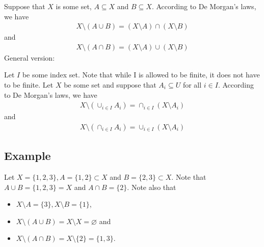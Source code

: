\documentclass[letterpaper,10pt,english]{jupyterBook}
\begin{document}
\sphinxAtStartPar
Suppose that \(X\) is some set, \(A \subseteq X\) and \(B \subseteq X\). According to De Morgan’s laws, we have
\begin{equation*}
\begin{split}X \setminus (A \cup B) = (X \setminus A) \cap (X \setminus B) \end{split}
\end{equation*}
\sphinxAtStartPar
and
\begin{equation*}
\begin{split}X \setminus (A \cap B) = (X \setminus A) \cup (X \setminus B) \end{split}
\end{equation*}
\sphinxAtStartPar
General version:

\sphinxAtStartPar
Let \(I\) be some index set. Note that while I is allowed to be finite, it does not have to be finite. Let \(X\) be some set and suppose that \(A_i \subseteq U\) for all \(i \in I\). According to De Morgan’s laws, we have
\begin{equation*}
\begin{split}X \setminus (\cup_{i \in I} A_i) = \cap_{i \in I} (X \setminus A_i) \end{split}
\end{equation*}
\sphinxAtStartPar
and
\begin{equation*}
\begin{split}X \setminus (\cap_{i \in I} A_i) = \cup_{i \in I} (X \setminus A_i) \end{split}
\end{equation*}

\subsection{Example}
\label{\detokenize{02.sets_numbers_coordinates_distances:id3}}
\sphinxAtStartPar
Let \(X = \{1, 2, 3\}, A = \{1, 2\} \subset X\) and \(B = \{2, 3\} \subset X\).  Note that \(A \cup B = \{1, 2, 3\} = X\) and \(A \cap B = \{2\}\). Note also that
\begin{itemize}
\item {} 
\sphinxAtStartPar
\(X \setminus A = \{3\}, X \setminus B = \{1\}\),

\item {} 
\sphinxAtStartPar
\(X \setminus (A \cup B) = X \setminus X = \varnothing\) and

\item {} 
\sphinxAtStartPar
\(X \setminus (A \cap B) = X \setminus \{2\} = \{1, 3\}\).

\end{itemize}
\end{document}
